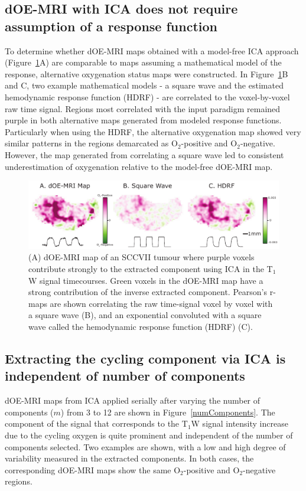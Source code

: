 \subsection{dOE-MRI with ICA does not require assumption of a response function}
To determine whether dOE-MRI maps obtained with a model-free ICA approach (Figure~\ref{fig_correlation}A) are comparable to maps assuming a mathematical model of the response, alternative oxygenation status maps were constructed. 
In Figure~\ref{fig_correlation}B and C, two example mathematical models - a square wave and the estimated hemodynamic response function (HDRF) - are correlated to the voxel-by-voxel raw time signal. 
Regions most correlated with the input paradigm remained purple in both alternative maps generated from modeled response functions.
Particularly when using the HDRF, the alternative oxygenation map showed very similar patterns in the regions demarcated as O$_2$-positive and O$_2$-negative. 
However, the map generated from correlating a square wave led to consistent underestimation of oxygenation relative to the model-free dOE-MRI map.

\begin{figure}[htbp]
   \centering
   \includegraphics[width=\textwidth]{oemri_thesis1/oemri_thesis1-images/fig3_correlation.pdf} %
   \caption{(A) dOE-MRI map of an SCCVII tumour where purple voxels contribute strongly to the extracted component using ICA in the T$_1$W signal timecourses. 
Green voxels in the dOE-MRI map have a strong contribution of the inverse extracted component. Pearson's r-maps are shown correlating the raw time-signal voxel by voxel with a square wave (B), and an exponential convoluted with a square wave called the hemodynamic response function (HDRF) (C).
   \label{fig_correlation}}
\end{figure}

\subsection{Extracting the cycling component via ICA is independent of number of components}
\label{sec:numComponents}
dOE-MRI maps from ICA applied serially after varying the number of components ($m$) from 3 to 12 are shown in Figure~\ref{numComponents}.
The component of the signal that corresponds to the T$_1$W signal intensity increase due to the cycling oxygen is quite prominent and independent of the number of components selected.
Two examples are shown, with a low and high degree of variability measured in the extracted components.
In both cases, the corresponding dOE-MRI maps show the same O$_2$-positive and O$_2$-negative regions.

